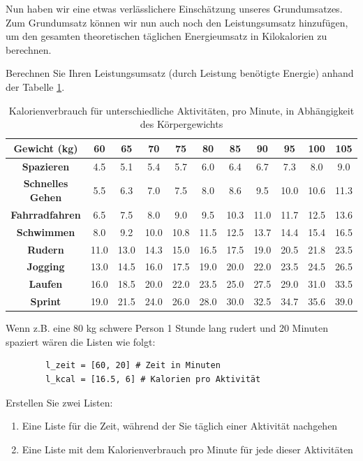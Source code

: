 Nun haben wir eine etwas verlässlichere Einschätzung unseres Grundumsatzes. Zum Grundumsatz können wir nun auch noch den Leistungsumsatz hinzufügen, um den gesamten theoretischen täglichen Energieumsatz in Kilokalorien zu berechnen.

\begin{myexercise}\label{ex:leistungsumsatz}
	Berechnen Sie Ihren Leistungsumsatz (durch Leistung benötigte Energie) anhand der Tabelle \ref{tab:kcal}.

	\begin{table}[H]
		\centering
		\begin{tabular}{c|*{10}{c}}
			\textbf{Gewicht (kg)}    & 60   & 65   & 70   & 75   & 80   & 85   & 90   & 95   & 100  & 105  \\
			\midrule\midrule
			\textbf{Spazieren}       & 4.5  & 5.1  & 5.4  & 5.7  & 6.0  & 6.4  & 6.7  & 7.3  & 8.0  & 9.0  \\
			\midrule
			\textbf{Schnelles Gehen} & 5.5  & 6.3  & 7.0  & 7.5  & 8.0  & 8.6  & 9.5  & 10.0 & 10.6 & 11.3 \\
			\midrule
			\textbf{Fahrradfahren}   & 6.5  & 7.5  & 8.0  & 9.0  & 9.5  & 10.3 & 11.0 & 11.7 & 12.5 & 13.6 \\
			\midrule
			\textbf{Schwimmen}       & 8.0  & 9.2  & 10.0 & 10.8 & 11.5 & 12.5 & 13.7 & 14.4 & 15.4 & 16.5 \\
			\midrule
			\textbf{Rudern}          & 11.0 & 13.0 & 14.3 & 15.0 & 16.5 & 17.5 & 19.0 & 20.5 & 21.8 & 23.5 \\
			\midrule
			\textbf{Jogging}         & 13.0 & 14.5 & 16.0 & 17.5 & 19.0 & 20.0 & 22.0 & 23.5 & 24.5 & 26.5 \\
			\midrule
			\textbf{Laufen}          & 16.0 & 18.5 & 20.0 & 22.0 & 23.5 & 25.0 & 27.5 & 29.0 & 31.0 & 33.5 \\
			\midrule
			\textbf{Sprint}          & 19.0 & 21.5 & 24.0 & 26.0 & 28.0 & 30.0 & 32.5 & 34.7 & 35.6 & 39.0 \\
		\end{tabular}
		\caption{Kalorienverbrauch für unterschiedliche Aktivitäten, pro Minute, in Abhängigkeit des Körpergewichts}
		\label{tab:kcal}
	\end{table}
	Wenn z.B. eine 80 kg schwere Person 1 Stunde lang rudert und 20 Minuten spaziert wären die Listen wie folgt:
	\begin{lstlisting}
		l_zeit = [60, 20] # Zeit in Minuten
		l_kcal = [16.5, 6] # Kalorien pro Aktivität
	\end{lstlisting}
	Erstellen Sie zwei Listen:
	\begin{enumerate}
		\item Eine Liste für die Zeit, während der Sie täglich einer Aktivität nachgehen
		\item Eine Liste mit dem Kalorienverbrauch pro Minute für jede dieser Aktivitäten
	\end{enumerate}


\end{myexercise}
